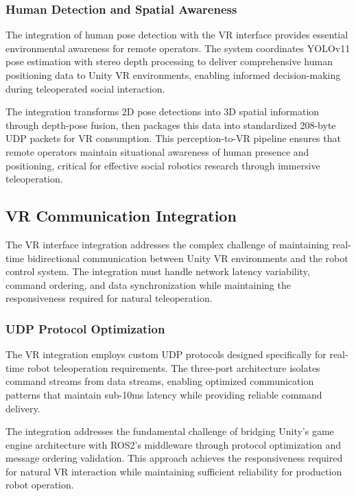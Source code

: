 \subsubsection{Human Detection and Spatial Awareness}

The integration of human pose detection with the VR interface provides essential environmental awareness for remote operators. The system coordinates YOLOv11 pose estimation with stereo depth processing to deliver comprehensive human positioning data to Unity VR environments, enabling informed decision-making during teleoperated social interaction.

The integration transforms 2D pose detections into 3D spatial information through depth-pose fusion, then packages this data into standardized 208-byte UDP packets for VR consumption. This perception-to-VR pipeline ensures that remote operators maintain situational awareness of human presence and positioning, critical for effective social robotics research through immersive teleoperation.

\subsection{VR Communication Integration}

The VR interface integration addresses the complex challenge of maintaining real-time bidirectional communication between Unity VR environments and the robot control system. The integration must handle network latency variability, command ordering, and data synchronization while maintaining the responsiveness required for natural teleoperation.

\subsubsection{UDP Protocol Optimization}

The VR integration employs custom UDP protocols designed specifically for real-time robot teleoperation requirements. The three-port architecture isolates command streams from data streams, enabling optimized communication patterns that maintain sub-10ms latency while providing reliable command delivery.

The integration addresses the fundamental challenge of bridging Unity's game engine architecture with ROS2's middleware through protocol optimization and message ordering validation. This approach achieves the responsiveness required for natural VR interaction while maintaining sufficient reliability for production robot operation.

